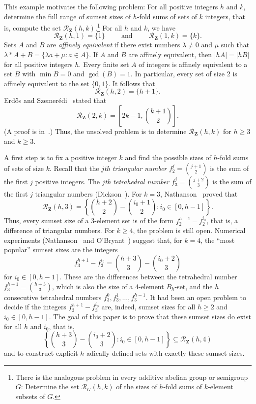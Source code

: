 \documentclass{amsart}
\newcommand{\Z}{\ensuremath{\mathbf Z}}
\newcommand{\mcr}{\ensuremath{ \mathcal R}}
\DeclareMathOperator{\qqand}{\qquad\text{and}\qquad}
\begin{document}
This example motivates the following  problem: 
For all positive integers $h$ and $k$, determine the full range 
of sumset sizes of $h$-fold sums of sets of 
$k$ integers, that is, compute the set $\mcr_{\Z}(h,k)$.\footnote{There is the 
analogous problem in every additive abelian group or semigroup $G$:  Determine 
the set $\mcr_{G}(h,k)$ of the sizes of $h$-fold sums of $k$-element subsets of $G$.}
For all $h$ and $k$, we have 
\[
\mcr_{\Z}(h,1) =  \{1\} \qqand \mcr_{\Z}(1,k) =  \{k\}.
\]
Sets $A$ and $ B$ are \emph{affinely equivalent} if there exist numbers 
$\lambda \neq 0$ and $\mu$ 
such that $\lambda \ast A + B = \{\lambda a + \mu: a \in A\}$.  If $A$ and $B$ are affinely equivalent, 
then $|hA| = |hB|$ for all positive integers $h$.  
Every finite set $A$ of integers is affinely equivalent to a set $B$ with $\min B = 0$ 
and $\gcd(B) = 1$.  In particular, every set of size 2 is affinely equivalent to the set $\{0,1\}$.
It follows that 
\[
\mcr_{\Z}(h,2) =  \{h+1\}. 
\]
Erd\H os and Szemer\' edi~\cite{erdo-szem83} stated that 
\[
\mcr_{\Z}(2,k) = \left[ 2k-1, \binom{k+1}{2} \right].
\]
(A proof is in~\cite{nath25bb}.)  
Thus, the unsolved problem is to determine $\mcr_{\Z}(h,k)$ 
for $h \geq 3$ and $k \geq 3$. 

A first step is to fix a positive integer $k$ and find the possible sizes 
of $h$-fold sums of sets of size $k$.  
Recall that the \emph{$j$th triangular number} 
$f_2^j = \binom{j+1}{2}$ is the sum of the first $j$ positive integers. 
The \emph{$j$th tetrahedral number} 
$f_3^j = \binom{j+2}{3}$ is the sum of the first $j$ triangular numbers (Dickson~\cite{dick20}).  
For $k = 3$, Nathanson~\cite{nath25bb} proved that 
\[
\mcr_{\Z}(h,3) = \left\{\binom{h+2}{2} - \binom{i_0+1}{2} : i_0 \in [0,h-1] \right\}.
\]
Thus, every sumset size of a 3-element set is 
of the form $f_2^{h+1} -  f_2^{i_0}$,  
that is, a difference of triangular numbers.
For $k \geq 4$, the problem is still open.  
Numerical experiments (Nathanson~\cite{nath25q} 
and O'Bryant~\cite{obry25}) suggest that, for $k = 4$, 
the ``most popular'' sumset sizes are the integers 
\[
f_3^{h+1} -  f_3^{i_0} = \binom{h+3}{3} - \binom{i_0+2}{3} 
\]
for $i_0 \in [0,h-1]$.    
These are the differences between the tetrahedral 
number  $f_3^{h+1}  = \binom{h+3}{3}$, 
which is also the size of a 4-element $B_h$-set, 
and the $h$ consecutive tetrahedral numbers 
$f_3^{0} ,  f_3^{1} ,\ldots, f_3^{h-1}$. 
It had been an open problem to decide if the  integers 
$f_3^{h+1}  - f_3^{i_0}  $ are, indeed,    
sumset sizes for all $h \geq 2$ and $i_0 \in [0,h-1]$.  
The goal of this paper is to prove that these sumset sizes do exist 
for all $h$ and $i_0$, that is, 
\[
\left\{\binom{h+3}{3} - \binom{i_0+2}{3} : i_0 \in [0,h-1] \right\} 
\subseteq \mcr_{\Z}(h,4)
\]
and to construct explicit $h$-adically defined sets with 
exactly these sumset sizes. 
\end{document}
